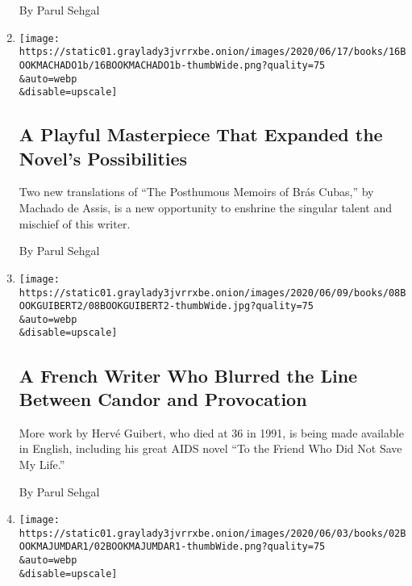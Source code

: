 \begin{enumerate}
  By Parul Sehgal
\item
  \href{/2020/06/16/books/review-posthumous-memoirs-bras-cubas-machado-de-assis.html}{}

  \texttt{[image: https://static01.graylady3jvrrxbe.onion/images/2020/06/17/books/16BOOKMACHADO1b/16BOOKMACHADO1b-thumbWide.png?quality=75\\\&auto=webp\\\&disable=upscale]}

  \hypertarget{a-playful-masterpiece-that-expanded-the-novels-possibilities}{%
  \subsection{A Playful Masterpiece That Expanded the Novel's
  Possibilities}\label{a-playful-masterpiece-that-expanded-the-novels-possibilities}}

  Two new translations of ``The Posthumous Memoirs of Brás Cubas,'' by
  Machado de Assis, is a new opportunity to enshrine the singular talent
  and mischief of this writer.

  By Parul Sehgal
\item
  \href{/2020/06/08/books/review-herve-guibert-to-friend-who-did-not-save-my-life-written-in-invisible-ink.html}{}

  \texttt{[image: https://static01.graylady3jvrrxbe.onion/images/2020/06/09/books/08BOOKGUIBERT2/08BOOKGUIBERT2-thumbWide.jpg?quality=75\\\&auto=webp\\\&disable=upscale]}

  \hypertarget{a-french-writer-who-blurred-the-line-between-candor-and-provocation}{%
  \subsection{A French Writer Who Blurred the Line Between Candor and
  Provocation}\label{a-french-writer-who-blurred-the-line-between-candor-and-provocation}}

  More work by Hervé Guibert, who died at 36 in 1991, is being made
  available in English, including his great AIDS novel ``To the Friend
  Who Did Not Save My Life.''

  By Parul Sehgal
\item
  \href{/2020/06/02/books/review-burning-megha-majumdar.html}{}

  \texttt{[image: https://static01.graylady3jvrrxbe.onion/images/2020/06/03/books/02BOOKMAJUMDAR1/02BOOKMAJUMDAR1-thumbWide.png?quality=75\\\&auto=webp\\\&disable=upscale]}

  \hypertarget{a-terrorist-attack-sparks-the-plot-of-megha-majumdars-powerful-debut-novel}{%
}
\end{enumerate}
